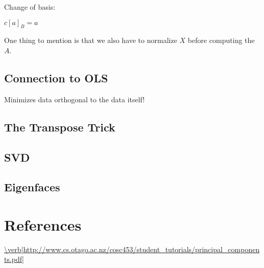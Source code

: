 \documentclass[11pt]{article}
\theoremstyle{plain}
\theoremstyle{definition}
\begin{document}
Change of basis:

$c[a]_B = a$

One thing to mention is that we also have to normalize $X$ before computing the $A$.

\subsection{Connection to OLS}

Minimizes data orthogonal to the data itself!
\subsection{The Transpose Trick}

\subsection{SVD}

\subsection{Eigenfaces}

\section{References}

 \url{\verb|http://www.cs.otago.ac.nz/cosc453/student_tutorials/principal_components.pdf|}
  
\end{document}
